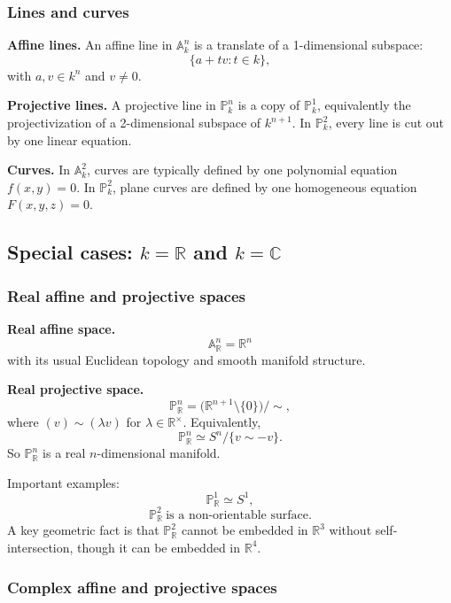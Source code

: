\documentclass[12pt,a4paper]{article}
\theoremstyle{plain}
\theoremstyle{definition}      %
\begin{document}
\subsubsection*{Lines and curves}

\textbf{Affine lines.}
An affine line in \(\mathbb A^n_k\) is a translate of a 1-dimensional subspace:
\[
\{a+tv : t\in k\},
\]
with \(a,v\in k^n\) and \(v\neq 0\).

\textbf{Projective lines.}
A projective line in \(\mathbb P^n_k\) is a copy of \(\mathbb P^1_k\), equivalently the projectivization of a 2-dimensional subspace of \(k^{n+1}\).
In \(\mathbb P^2_k\), every line is cut out by one linear equation.

\textbf{Curves.}
In \(\mathbb A^2_k\), curves are typically defined by one polynomial equation \(f(x,y)=0\).
In \(\mathbb P^2_k\), plane curves are defined by one homogeneous equation \(F(x,y,z)=0\).



\subsection*{Special cases: \(k=\mathbb R\) and \(k=\mathbb C\)}

\subsubsection*{Real affine and projective spaces}

\textbf{Real affine space.}
\[
\mathbb A^n_{\mathbb R}=\mathbb R^n
\]
with its usual Euclidean topology and smooth manifold structure.

\textbf{Real projective space.}
\[
\mathbb P^n_{\mathbb R}
=
\bigl(\mathbb R^{n+1}\setminus\{0\}\bigr)/\sim,
\]
where \((v)\sim(\lambda v)\) for \(\lambda\in\mathbb R^\times\).
Equivalently,
\[
\mathbb P^n_{\mathbb R}\simeq S^n/\{v\sim -v\}.
\]
So \(\mathbb P^n_{\mathbb R}\) is a real \(n\)-dimensional manifold.

Important examples:
\[
\mathbb P^1_{\mathbb R}\simeq S^1,
\]
\[
\mathbb P^2_{\mathbb R}\ \text{is a non-orientable surface}.
\]
A key geometric fact is that \(\mathbb P^2_{\mathbb R}\) cannot be embedded in \(\mathbb R^3\) without self-intersection, though it can be embedded in \(\mathbb R^4\).

\subsubsection*{Complex affine and projective spaces}
\end{document}
